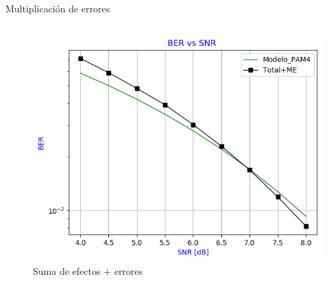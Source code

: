 \documentclass[xcolor=table]{beamer}
\begin{document}
\begin{frame}{Multiplicación de errores}
\begin{columns}
\begin{column}{0.48\paperwidth}
    \begin{figure}
        \centering
        \includegraphics[width=\textwidth]{Graficos/BER_vs_SNR_5.png}
        \caption{Suma de efectos + errores}
        \label{fig:my_label}
    \end{figure}
    
    \end{column}
\end{columns}
\end{frame}
\end{document}
